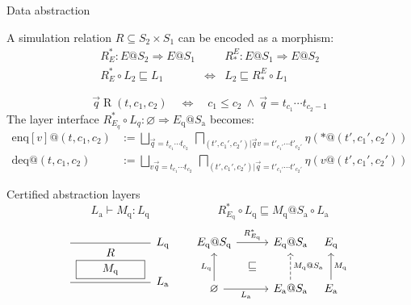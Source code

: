 \documentclass[aspectratio=54]{beamer}
\newcommand{\kw}[1]{\ensuremath{ \mathrm{#1} }}
\begin{document}
\begin{frame}{Data abstraction} %
  \begin{definition}
    A simulation relation $R \subseteq S_2 \times S_1$
    can be encoded as a morphism:
    \[
      \begin{array}{ccc}
        R^*_E : E@S_2 \Rightarrow E@S_1 & &
        R_*^E : E@S_1 \Rightarrow E@S_2 \\[1ex]
        R^*_E \circ L_2 \sqsubseteq L_1 &
        \Leftrightarrow &
        L_2 \sqsubseteq R_*^E \circ L_1
      \end{array}
    \]
  \end{definition}
  \pause
  \begin{example}
    \[
      \vec{q} \mathrel{R} (t, c_1, c_2)
      \quad \Leftrightarrow \quad
      c_1 \le c_2 \:\wedge\:
      \vec{q} = t_{c_1} \cdots t_{c_2 - 1}
    \]
    The layer interface
    $R^*_{E_q} \circ L_q : \varnothing \Rightarrow E_\kw{q}@S_\kw{a}$
    becomes:
    \begin{align*}
      \kw{enq}[v]@(t, c_1, c_2) &:=
        \bigsqcup_{\vec{q} = t_{c_1}\cdots t_{c_2}} \:
        \bigsqcap_{(t', c_1', c_2') | \vec{q}v = t'_{c_1'} \cdots t'_{c_2'}}
        \eta(*@(t', c_1', c_2')) \\
      \kw{deq}@(t, c_1, c_2) &:=
        \bigsqcup_{v\vec{q} = t_{c_1}\cdots t_{c_2}} \:
        \bigsqcap_{(t', c_1', c_2') | \vec{q} = t'_{c_1'} \cdots t'_{c_2'}}
        \eta(v@(t', c_1', c_2'))
    \end{align*}
  \end{example}
\end{frame}

\begin{frame}[fragile]{Certified abstraction layers}
    \[
        L_\kw{a} \vdash M_\kw{q} : L_\kw{q} \qquad \qquad \qquad
        R^*_{E_\kw{q}} \circ L_\kw{q} \sqsubseteq
          M_\kw{q}@S_\kw{a} \circ L_\kw{a}
    \]
    \[
      \begin{prooftree}
        \infer0[$L_\kw{q}$]{
          \begin{array}{c}
            R \\
            \fbox{$\qquad M_\kw{q} \qquad$}
          \end{array}}
        \infer1[$L_\kw{a}$]{}
      \end{prooftree}
      \qquad
      \begin{tikzcd}[sep=tiny]
        E_\kw{q}@S_\kw{q} \ar[rr, "R^*_{E_\kw{q}}"] & &
        E_\kw{q}@S_\kw{a} & E_\kw{q} \\
        & \sqsubseteq & & \\
        \varnothing \ar[uu, "L_\kw{q}"] \ar[rr, "L_\kw{a}"'] & &
        E_\kw{a}@S_\kw{a} \ar[uu, "M_\kw{q}@S_\kw{a}"', dashed] &
        E_\kw{a} \ar[uu, "M_\kw{q}"']
      \end{tikzcd} 
    \]
\end{frame}
\end{document}
